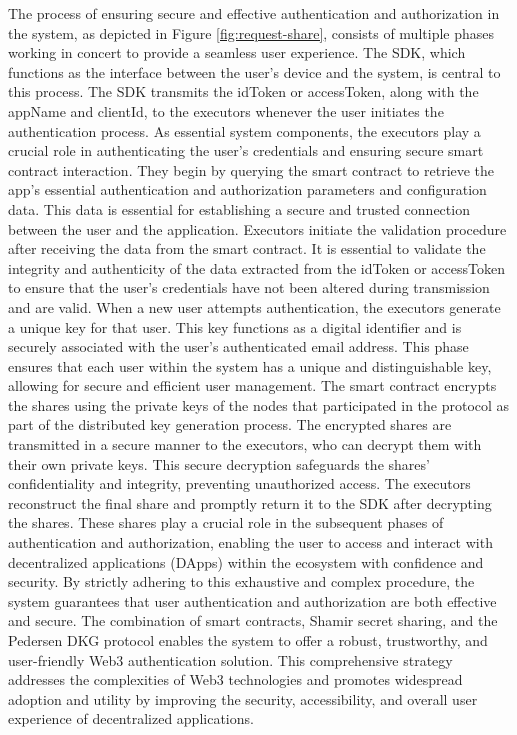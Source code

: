 \documentclass[../Main.tex]{subfiles}
\begin{document}
The process of ensuring secure and effective authentication and authorization in the system, as depicted in Figure \ref{fig:request-share}, consists of multiple phases working in concert to provide a seamless user experience. The SDK, which functions as the interface between the user's device and the system, is central to this process. The SDK transmits the idToken or accessToken, along with the appName and clientId, to the executors whenever the user initiates the authentication process. As essential system components, the executors play a crucial role in authenticating the user's credentials and ensuring secure smart contract interaction. They begin by querying the smart contract to retrieve the app's essential authentication and authorization parameters and configuration data. This data is essential for establishing a secure and trusted connection between the user and the application. Executors initiate the validation procedure after receiving the data from the smart contract. It is essential to validate the integrity and authenticity of the data extracted from the idToken or accessToken to ensure that the user's credentials have not been altered during transmission and are valid. When a new user attempts authentication, the executors generate a unique key for that user. This key functions as a digital identifier and is securely associated with the user's authenticated email address. This phase ensures that each user within the system has a unique and distinguishable key, allowing for secure and efficient user management. The smart contract encrypts the shares using the private keys of the nodes that participated in the protocol as part of the distributed key generation process. The encrypted shares are transmitted in a secure manner to the executors, who can decrypt them with their own private keys. This secure decryption safeguards the shares' confidentiality and integrity, preventing unauthorized access. The executors reconstruct the final share and promptly return it to the SDK after decrypting the shares. These shares play a crucial role in the subsequent phases of authentication and authorization, enabling the user to access and interact with decentralized applications (DApps) within the ecosystem with confidence and security. By strictly adhering to this exhaustive and complex procedure, the system guarantees that user authentication and authorization are both effective and secure. The combination of smart contracts, Shamir secret sharing, and the Pedersen DKG protocol enables the system to offer a robust, trustworthy, and user-friendly Web3 authentication solution. This comprehensive strategy addresses the complexities of Web3 technologies and promotes widespread adoption and utility by improving the security, accessibility, and overall user experience of decentralized applications.
\end{document}
